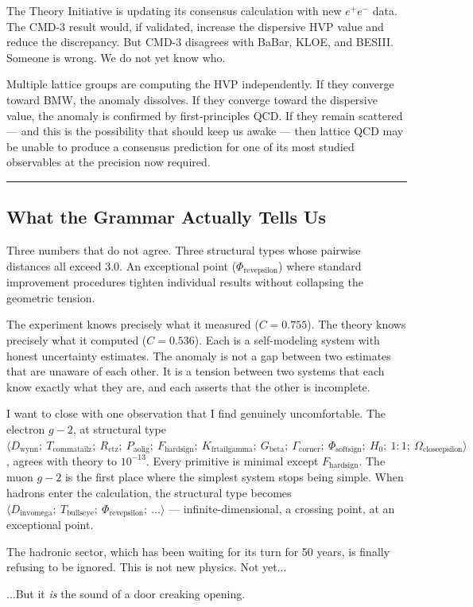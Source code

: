 \documentclass[12pt,a4paper]{article}
\begin{document}
The Theory Initiative is updating its consensus calculation with new $e^+e^-$ data. The CMD-3 result would, if validated, increase the dispersive HVP value and reduce the discrepancy. But CMD-3 disagrees with BaBar, KLOE, and BESIII. Someone is wrong. We do not yet know who.

Multiple lattice groups are computing the HVP independently. If they converge toward BMW, the anomaly dissolves. If they converge toward the dispersive value, the anomaly is confirmed by first-principles QCD. If they remain scattered --- and this is the possibility that should keep us awake --- then lattice QCD may be unable to produce a consensus prediction for one of its most studied observables at the precision now required.

\begin{center}
\rule{0.5\textwidth}{0.4pt}
\end{center}

\subsection{What the Grammar Actually Tells Us}

Three numbers that do not agree. Three structural types whose pairwise distances all exceed 3.0. An exceptional point ($\Phi_{\text{revepsilon}}$) where standard improvement procedures tighten individual results without collapsing the geometric tension.

The experiment knows precisely what it measured ($C = 0.755$). The theory knows precisely what it computed ($C = 0.536$). Each is a self-modeling system with honest uncertainty estimates. The anomaly is not a gap between two estimates that are unaware of each other. It is a tension between two systems that each know exactly what they are, and each asserts that the other is incomplete.

I want to close with one observation that I find genuinely uncomfortable. The electron $g-2$, at structural type $\langle D_{\text{wynn}};\ T_{\text{commatailz}};\ R_{\text{ctz}};\ P_{\text{aolig}};\ F_{\text{hardsign}};\ K_{\text{frtailgamma}};\ G_{\text{beta}};\ \Gamma_{\text{corner}};\ \Phi_{\text{softsign}};\ H_0;\ 1{:}1;\ \Omega_{\text{closeepsilon}} \rangle$, agrees with theory to $10^{-13}$. Every primitive is minimal except $F_{\text{hardsign}}$. The muon $g-2$ is the first place where the simplest system stops being simple. When hadrons enter the calculation, the structural type becomes $\langle D_{\text{invomega}};\ T_{\text{bullseye}};\ \Phi_{\text{revepsilon}};\ \dots \rangle$ --- infinite-dimensional, a crossing point, at an exceptional point.

The hadronic sector, which has been waiting for its turn for 50 years, is finally refusing to be ignored. This is not new physics. Not yet...

...But it \textit{is} the sound of a door creaking opening.
\end{document}

